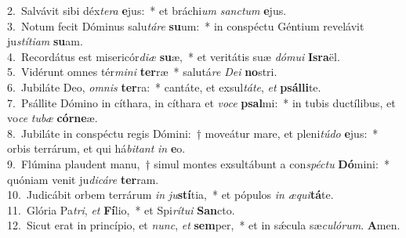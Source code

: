 {2.~}Salvávit sibi déx\textit{te}\textit{ra} \textbf{e}jus:~* et bráchi\textit{um} \textit{san}\textit{ctum} \textbf{e}jus.\\
{3.~}Notum fecit Dóminus salu\textit{tá}\textit{re} \textbf{su}um:~* in conspéctu Géntium revelávit ju\textit{stí}\textit{ti}\textit{am} \textbf{su}am.\\
{4.~}Recordátus est misericór\textit{di}\textit{æ} \textbf{su}æ,~* et veritátis suæ \textit{dó}\textit{mu}\textit{i} \textbf{Is}\textbf{ra}ël.\\
{5.~}Vidérunt omnes tér\textit{mi}\textit{ni} \textbf{ter}ræ~* salutá\textit{re} \textit{De}\textit{i} \textbf{no}stri.\\
{6.~}Jubiláte Deo, \textit{om}\textit{nis} \textbf{ter}ra:~* cantáte, et exsul\textit{tá}\textit{te}, \textit{et} \textbf{psál}\textbf{li}te.\\
{7.~}Psállite Dómino in cíthara, in cíthara et \textit{vo}\textit{ce} \textbf{psal}mi:~* in tubis ductílibus, et vo\textit{ce} \textit{tu}\textit{bæ} \textbf{cór}\textbf{ne}æ.\\
{8.~}Jubiláte in conspéctu regis Dómini:~† moveátur mare, et pleni\textit{tú}\textit{do} \textbf{e}jus:~* orbis terrárum, et qui há\textit{bi}\textit{tant} \textit{in} \textbf{e}o.\\
{9.~}Flúmina plaudent manu,~† simul montes exsultábunt a con\textit{spé}\textit{ctu} \textbf{Dó}mini:~* quóniam venit ju\textit{di}\textit{cá}\textit{re} \textbf{ter}ram.\\
{10.~}Judicábit orbem terrárum \textit{in} \textit{ju}\textbf{stí}tia,~* et pópulos \textit{in} \textit{æ}\textit{qui}\textbf{tá}te.\\
{11.~}Glória Pa\textit{tri}, \textit{et} \textbf{Fí}lio,~* et Spi\textit{rí}\textit{tu}\textit{i} \textbf{San}cto.\\
{12.~}Sicut erat in princípio, et \textit{nunc}, \textit{et} \textbf{sem}per,~* et in sǽcula sæ\textit{cu}\textit{ló}\textit{rum}. \textbf{A}men.\\
